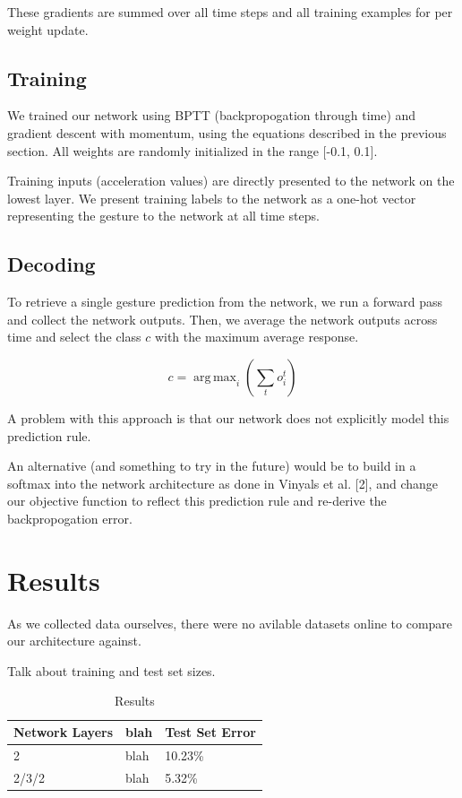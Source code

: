 \documentclass[11pt]{article}
\DeclareMathOperator*{\argmax}{arg\,max}
\begin{document}
These gradients are summed over all time steps and
all training examples for per weight update.

\subsection{Training}

We trained our network using BPTT (backpropogation through time) and
gradient descent with momentum, using the equations described in
the previous section. All weights are randomly initialized
in the range [-0.1, 0.1].

Training inputs (acceleration values) are directly presented to
the network on the lowest layer. We present training labels 
to the network as a one-hot vector representing the
gesture to the network at all time steps.

\subsection{Decoding}

To retrieve a single gesture prediction from the network,
we run a forward pass and collect the network outputs. 
Then, we average the network outputs
across time and select the class \(c\) with the maximum average response.

\[ c = \argmax_{i}(\sum_{t} o_{i}^{t}) \]

A problem with this approach is that our network does not
explicitly model this prediction rule. 

An alternative (and something to try in the future) would
be to build in a softmax into the network architecture as done
in Vinyals et al. [2], and change our objective function to reflect
this prediction rule and re-derive the backpropogation error.

\section{Results}

As we collected data ourselves, there were no avilable datasets
online to compare our architecture against.

Talk about training and test set sizes.

\begin{table}[h]
\begin{center}
\begin{tabular}{|l|l|l|}
\hline \bf Network Layers & \bf blah & \bf Test Set Error \\ \hline
2 & blah & 10.23\% \\
2/3/2 & blah & 5.32\% \\
\hline
\end{tabular}
\end{center}
\caption{\label{font-table} Results }
\end{table}
\end{document}

